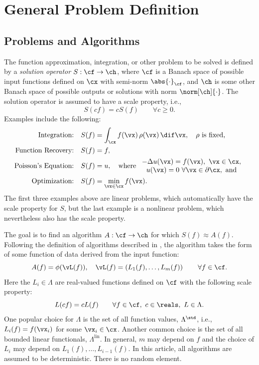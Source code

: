 \documentclass[]{elsarticle}
\DeclareMathOperator{\lin}{lin}
\theoremstyle{definition}
\theoremstyle{remark}
\newcommand{\Fnorm}[1]{\abs{#1}_{\cf}}
\begin{document}
\section{General Problem Definition} \label{probdefsec}

\subsection{Problems and Algorithms} The function approximation, integration, or other problem to be solved is defined by a \emph{solution operator} $S:\cf \to \ch$, where $\cf$ is a Banach space of possible input functions defined on $\cx$ with semi-norm $\Fnorm{\cdot}$, and $\ch$ is some other Banach space of possible outputs or solutions with norm $\norm[\ch]{\cdot}$. The solution operator is assumed to have a scale property, i.e., 
\[
S(cf) = cS(f) \qquad \forall c\ge 0.
\]
Examples include the following:
\begin{align*}
\text{Integration:} \quad & S(f) = \int_{\cx} f(\vx) \, \rho(\vx) \, \dif \vx, \quad \rho \text{ is fixed,}\\
\text{Function Recovery:} \quad & S(f) = f, \\
\text{Poisson's Equation:} \quad & S(f) = u, \quad \text{where } \begin{array}{c} -\Delta u(\vx) = f(\vx), \ \vx \in \cx, \\ u(\vx)=0 \ \forall \vx \in \partial \cx, \text{ and}\end{array} \\
\text{Optimization:} \quad & S(f) = \min_{\vx \in \cx} f(\vx).
\end{align*}
The first three examples above are linear problems, which automatically have the scale property for $S$, but the last example is a nonlinear problem, which nevertheless also has the scale property.

The goal is to find an algorithm $A:\cf \to \ch$ for which $S(f) \approx A(f)$. Following the definition of algorithms described in \cite[Section 3.2]{TraWasWoz88}, the algorithm takes the form of some function of data derived from the input function:
\begin{equation}
\label{algoform}
A(f) =  \phi(\vL(f)), \quad \vL(f) = \left(L_1(f), \ldots, L_m(f)\right) \qquad \forall f \in \cf.
\end{equation}
Here the $L_i \in \Lambda$ are real-valued functions defined on $\cf$ with the following scale property:
\begin{equation}
\label{dataassump}
L(cf) = cL(f) \qquad \forall f \in \cf, \ c \in \reals, \ L \in \Lambda.
\end{equation}
One popular choice for $\Lambda$ is the set of all function values, $\Lambda^{\std}$, i.e., $L_i(f) = f(\vx_i)$ for some $\vx_i \in \cx$.  Another common choice is the set of all bounded linear functionals, $\Lambda^{\lin}$.  In general, $m$ may depend on $f$ and the choice of $L_i$ may depend on $L_1(f), \ldots, L_{i-1}(f)$.  In this article, all algorithms are assumed to be deterministic.  There is no random element.
\end{document}
